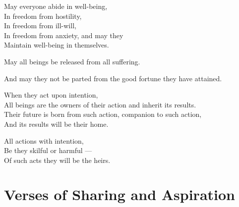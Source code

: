 May everyone abide in well-being,\\
In freedom from hostility,\\
In freedom from ill-will,\\
In freedom from anxiety, and may they\\
Maintain well-being in themselves.

May all beings be released from all suffering.

And may they not be parted from the good fortune they have attained.

When they act upon intention,\\
All beings are the owners of their action and inherit its results.\\
Their future is born from such action, companion to such action,\\
And its results will be their home.

All actions with intention,\\
Be they skilful or harmful ---\\
Of such acts they will be the heirs.


\section{Verses of Sharing and Aspiration}

\begin{leader}
\end{leader}


